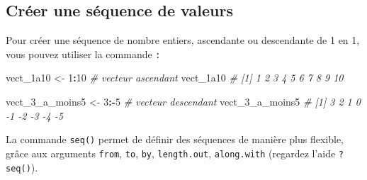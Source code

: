 \documentclass[
]{book}
\newenvironment{Shaded}{\begin{snugshade}}{\end{snugshade}}
\newcommand{\CommentTok}[1]{\textcolor[rgb]{0.56,0.35,0.01}{\textit{#1}}}
\newcommand{\DecValTok}[1]{\textcolor[rgb]{0.00,0.00,0.81}{#1}}
\newcommand{\NormalTok}[1]{#1}
\newcommand{\OtherTok}[1]{\textcolor[rgb]{0.56,0.35,0.01}{#1}}
\newcommand{\SpecialCharTok}[1]{\textcolor[rgb]{0.81,0.36,0.00}{\textbf{#1}}}
\begin{document}
\subsection{Créer une séquence de valeurs}\label{cruxe9er-une-suxe9quence-de-valeurs}

Pour créer une séquence de nombre entiers, ascendante ou descendante de 1 en 1, vous pouvez utiliser la commande \texttt{:}

\begin{Shaded}
\begin{Highlighting}[]
\NormalTok{vect\_1a10 }\OtherTok{\textless{}{-}} \DecValTok{1}\SpecialCharTok{:}\DecValTok{10} \CommentTok{\# vecteur ascendant}
\NormalTok{vect\_1a10 }\CommentTok{\# [1]  1  2  3  4  5  6  7  8  9 10}

\NormalTok{vect\_3\_a\_moins5 }\OtherTok{\textless{}{-}} \DecValTok{3}\SpecialCharTok{:{-}}\DecValTok{5} \CommentTok{\# vecteur descendant}
\NormalTok{vect\_3\_a\_moins5 }\CommentTok{\# [1] 3  2  1  0 {-}1 {-}2 {-}3 {-}4 {-}5}
\end{Highlighting}
\end{Shaded}

La commande \texttt{seq()} permet de définir des séquences de manière plus flexible,
grâce aux arguments \texttt{from}, \texttt{to}, \texttt{by}, \texttt{length.out}, \texttt{along.with} (regardez l'aide \texttt{?seq()}).
\end{document}
